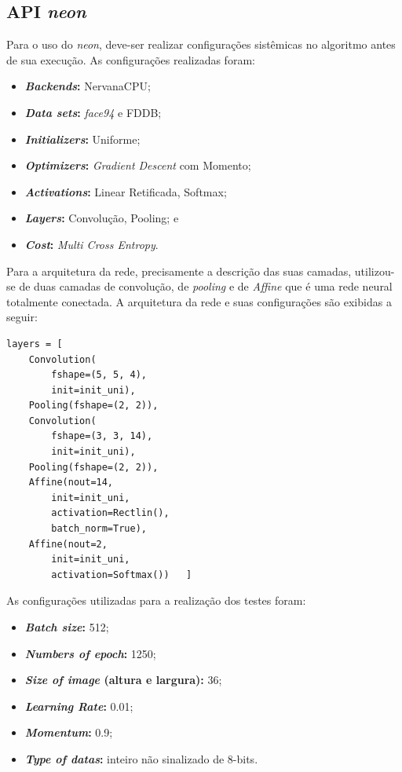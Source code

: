 \documentclass[10pt, conference]{IEEEtran}
\begin{document}
	\subsection{API \textit{neon}}
		Para o uso do \textit{neon}, deve-ser realizar configurações sistêmicas no algoritmo antes de sua execução. As configurações realizadas foram:

			\begin{itemize}
				\item \textbf{\textit{Backends}:} NervanaCPU;
				\item \textbf{\textit{Data sets}:} \textit{face94} e FDDB;
				\item \textbf{\textit{Initializers}:} Uniforme;
				\item \textbf{\textit{Optimizers}:} \textit{Gradient Descent} com Momento;
				\item \textbf{\textit{Activations}:} Linear Retificada, Softmax;
				\item \textbf{\textit{Layers}:} Convolução, Pooling; e
				\item \textbf{\textit{Cost}:} \textit{Multi Cross Entropy}.
			\end{itemize}
		
		Para a arquitetura da rede, precisamente a descrição das suas camadas, utilizou-se de duas camadas de convolução, de \textit{pooling} e de \textit{Affine} que é uma rede neural totalmente conectada. A arquitetura da rede e suas configurações são exibidas a seguir:

		\begin{verbatim}
layers = [
	Convolution(
		fshape=(5, 5, 4), 
		init=init_uni),
	Pooling(fshape=(2, 2)),
	Convolution(
		fshape=(3, 3, 14), 
		init=init_uni),
	Pooling(fshape=(2, 2)),
	Affine(nout=14, 
		init=init_uni, 
		activation=Rectlin(), 
		batch_norm=True),
	Affine(nout=2, 
		init=init_uni, 
		activation=Softmax())   ]
		\end{verbatim}

		As configurações utilizadas para a realização dos testes foram:

		\begin{itemize}
			\item \textbf{\textit{Batch size}:} 512;
			\item \textbf{\textit{Numbers of epoch}:} 1250;
			\item \textbf{\textit{Size of image} (altura e largura):} 36;
			\item \textbf{\textit{Learning Rate}:} 0.01;
			\item \textbf{\textit{Momentum}:} 0.9;
			\item \textbf{\textit{Type of datas}:} inteiro não sinalizado de 8-bits.
		\end{itemize}
\end{document}
